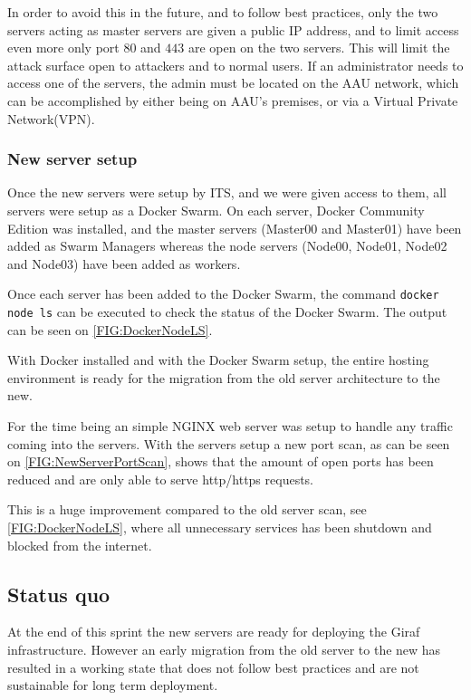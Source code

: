 
In order to avoid this in the future, and to follow best practices, only the two servers acting as master servers are given a public IP address, and to limit access even more only port $80$ and $443$ are open on the two servers.
This will limit the attack surface open to attackers and to normal users.
If an administrator needs to access one of the servers, the admin must be located on the AAU network, which can be accomplished by either being on AAU's premises, or via a Virtual Private Network(VPN).

\subsubsection{New server setup}

Once the new servers were setup by ITS, and we were given access to them, all servers were setup as a Docker Swarm.
On each server, Docker Community Edition was installed, and the master servers (Master00 and Master01) have been added as Swarm Managers whereas the node servers (Node00, Node01, Node02 and Node03) have been added as workers.

Once each server has been added to the Docker Swarm, the command \lstinline$docker node ls$ can be executed to check the status of the Docker Swarm.
The output can be seen on \autoref{FIG:DockerNodeLS}.

With Docker installed and with the Docker Swarm setup, the entire hosting environment is ready for the migration from the old server architecture to the new.

For the time being an simple NGINX web server was setup to handle any traffic coming into the servers. 
With the servers setup a new port scan, as can be seen on \autoref{FIG:NewServerPortScan}, shows that the amount of open ports has been reduced and are only able to serve http/https requests.


This is a huge improvement compared to the old server scan, see \autoref{FIG:DockerNodeLS}, where all unnecessary services has been shutdown and blocked from the internet. 

\subsection{Status quo}
At the end of this sprint the new servers are ready for deploying the Giraf infrastructure.
However an early migration from the old server to the new has resulted in a working state that does not follow best practices and are not sustainable for long term deployment.

